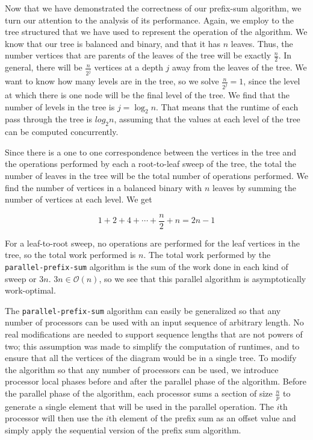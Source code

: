 \documentclass[12pt,twoside]{reedthesis}
\newcommand{\procedure}[1]{{\tt#1}}
\begin{document}
Now that we have demonstrated the correctness of our prefix-sum algorithm, we turn our attention to the analysis of its performance. Again, we employ to the tree structured that we have used to represent the operation of the algorithm. We know that our tree is balanced and binary, and that it has $n$ leaves. Thus, the number vertices that are parents of the leaves of the tree will be exactly $\frac{n}{2}$. In general, there will be $\frac{n}{2^j}$ vertices at a depth $j$ away from the leaves of the tree. We want to know how many levels are in the tree, so we solve $\frac{n}{2^j} = 1$, since the level at which there is one node will be the final level of the tree. We find that the number of levels in the tree is $j = \log_2 n$. That means that the runtime of each pass through the tree is $log_2 n$, assuming that the values at each level of the tree can be computed concurrently.

Since there is a one to one correspondence between the vertices in the tree and the operations performed by each a root-to-leaf sweep of the tree, the total the number of leaves in the tree will be the total number of operations performed. We find the number of vertices in a balanced binary with $n$ leaves by summing the number of vertices at each level. We get

$$
1 + 2 + 4 + \cdots + \frac{n}{2} + n = 2n -1
$$

For a leaf-to-root sweep, no operations are performed for the leaf vertices in the tree, so the total work performed is $n$. The total work performed by the \procedure{parallel-prefix-sum} algorithm is the sum of the work done in each kind of sweep or $3n$. $3n \in \mathcal{O}(n)$, so we see that this parallel algorithm is asymptotically work-optimal.
\vspace{1pc}

The \procedure{parallel-prefix-sum} algorithm can easily be generalized so that any number of processors can be used with an input sequence of arbitrary length. No real modifications are needed to support sequence lengths that are not powers of two; this assumption was made to simplify the computation of runtimes, and to ensure that all the vertices of the diagram would be in a single tree. To modify the algorithm so that any number of processors can be used, we introduce processor local phases before and after the parallel phase of the algorithm. Before the parallel phase of the algorithm, each processor sums a section of size $\frac{n}{p}$ to generate a single element that will be used in the parallel operation. The $i$th processor will then use the $i$th element of the prefix sum as an offset value and simply apply the sequential version of the prefix sum algorithm.
\end{document}
